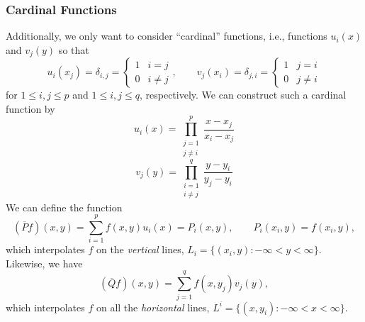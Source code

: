 \documentclass[letterpaper]{article}
\begin{document}
\subsubsection{Cardinal Functions}
Additionally, we only want to consider ``cardinal'' functions, i.e., functions $u_{i}(x)$ and $v_{j}(y)$ so that
\[u_{i}(x_{j}) = \delta_{i, j} = \begin{cases}
    1 & i = j \\ 
    0 & i \neq j
\end{cases}, \qquad v_{j}(x_{i}) = \delta_{j, i} = \begin{cases}
    1 & j = i \\ 
    0 & j \neq i
\end{cases}\]
for $1 \leq i, j \leq p$ and $1 \leq i, j \leq q$, respectively. We can construct such a cardinal function by 
\begin{equation}\label{lec18u}
    u_{i}(x) = \prod_{\substack{j = 1 \\ j \neq i}}^{p} \frac{x - x_j}{x_i - x_j}
\end{equation}
\begin{equation}\label{lec18v}
    v_{j}(y) = \prod_{\substack{i = 1 \\ i \neq j}}^{q} \frac{y - y_i}{y_j - y_i}
\end{equation}
We can define the function \[(\overline{P}f)(x, y) = \sum_{i = 1}^{p} f(x, y) u_{i}(x) = P_{i}(x, y), \qquad P_{i}(x_{i}, y) = f(x_{i}, y),\]
which interpolates $f$ on the \emph{vertical} lines, $L_{i} = \{(x_i, y) : -\infty < y < \infty\}.$ Likewise, we have 
\[(\overline{Q}f)(x, y) = \sum_{j = 1}^{q} f(x, y_{j}) v_{j}(y),\]
which interpolates $f$ on all the \emph{horizontal} lines, $L^i = \{(x, y_i) : -\infty < x < \infty\}.$
\end{document}
